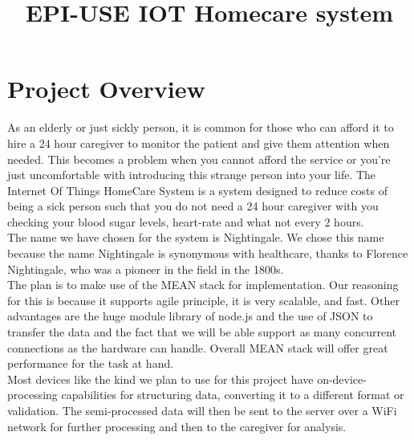 \documentclass[12pt]{article}
\title{EPI-USE IOT Homecare system}
\begin{document}
    \newcommand{\titleimage}{iot.png}
    
    
    
	
	\newpage

	\section{Project Overview}
	As an elderly or just sickly person, it is common for those who can afford it to hire a 24 hour caregiver to monitor the patient and give them attention when needed. This becomes a problem when you cannot afford the service or you're just uncomfortable with introducing this strange person into your life. The Internet Of Things HomeCare System is a system designed to reduce costs of being a sick person such that you do not need a 24 hour caregiver with you checking your blood sugar levels, heart-rate and what not every 2 hours. \\
	
	The name we have chosen for the system is Nightingale. We chose this name because the name Nightingale is synonymous with healthcare, thanks to Florence Nightingale, who was a pioneer in the field in the 1800s.\\
	
		The plan is to make use of the MEAN stack for implementation. Our reasoning for this is because it supports agile principle, it is very scalable, and fast. Other advantages are the huge module library of node.js and the use of JSON to transfer the data and the fact that we will be able support as many concurrent connections as the hardware can handle. Overall MEAN stack will offer great performance for the task at hand.\\
	
	Most devices like the kind we plan to use for this project have on-device-processing capabilities for structuring data, converting it to a different format or validation. The semi-processed data will then be sent to the server over a WiFi network for further processing and then to the caregiver for analysis.
	
\end{document}
